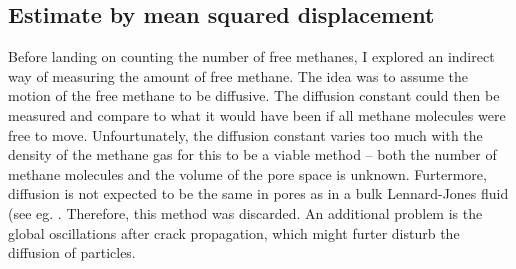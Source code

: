 \subsection{Estimate by mean squared displacement}
Before landing on counting the number of free methanes, I explored an indirect way of measuring the amount of free methane. The idea was to assume the motion of the free methane to be diffusive. The diffusion constant could then be measured and compare to what it would have been if all methane molecules were free to move. Unfourtunately, the diffusion constant varies too much with the density of the methane gas for this to be a viable method -- both the number of methane molecules and the volume of the pore space is unknown. Furtermore, diffusion is not expected to be the same in pores as in a bulk Lennard-Jones fluid (see eg. \citet[p. 18]{Pozhar:1668293}. Therefore, this method was discarded. An additional problem is the global oscillations after crack propagation, which might furter disturb the diffusion of particles. 


